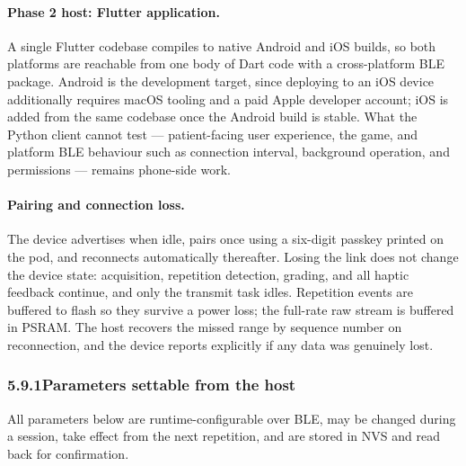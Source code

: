 \documentclass[11pt]{article}
\begin{document}
\paragraph{Phase 2 host: Flutter application.} A single Flutter codebase
compiles to native Android and iOS builds, so both platforms are reachable from
one body of Dart code with a cross-platform BLE package. Android is the
development target, since deploying to an iOS device additionally requires macOS
tooling and a paid Apple developer account; iOS is added from the same codebase
once the Android build is stable. What the Python client cannot test ---
patient-facing user experience, the game, and platform BLE behaviour such as
connection interval, background operation, and permissions --- remains
phone-side work.

\paragraph{Pairing and connection loss.} The device advertises when idle, pairs
once using a six-digit passkey printed on the pod, and reconnects automatically
thereafter. Losing the link does not change the device state: acquisition,
repetition detection, grading, and all haptic feedback continue, and only the
transmit task idles. Repetition events are buffered to flash so they survive a
power loss; the full-rate raw stream is buffered in PSRAM. The host recovers the
missed range by sequence number on reconnection, and the device reports
explicitly if any data was genuinely lost.

\subsubsection*{5.9.1\quad Parameters settable from the host}

All parameters below are runtime-configurable over BLE, may be changed during a
session, take effect from the next repetition, and are stored in NVS and read
back for confirmation.
\end{document}
